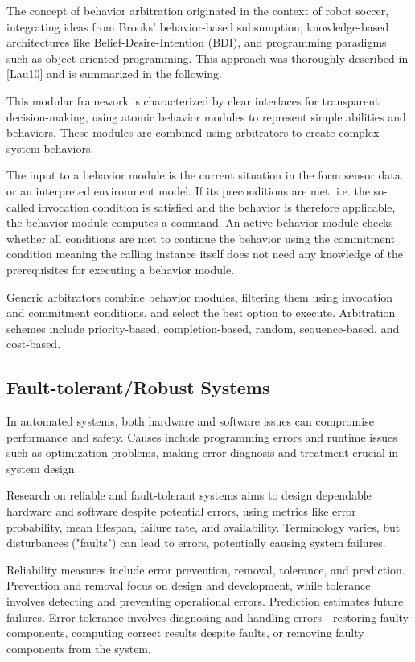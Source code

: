 The concept of behavior arbitration originated in the context of robot soccer, integrating ideas from Brooks' behavior-based subsumption, knowledge-based architectures like Belief-Desire-Intention (BDI), and programming paradigms such as object-oriented programming.
This approach was thoroughly described in [Lau10] and is summarized in the following.

This modular framework is characterized by clear interfaces for transparent decision-making, using atomic behavior modules to represent simple abilities and behaviors.
These modules are combined using arbitrators to create complex system behaviors.

The input to a behavior module is the current situation in the form sensor data or an interpreted environment model.
If its preconditions are met, i.e. the so-called invocation condition is satisfied and the behavior is therefore applicable, the behavior module computes a command.
An active behavior module checks whether all conditions are met to continue the behavior using the commitment condition meaning the calling instance itself does not need any knowledge of the prerequisites for executing a behavior module.

Generic arbitrators combine behavior modules, filtering them using invocation and commitment conditions, and select the best option to execute.
Arbitration schemes include priority-based, completion-based, random, sequence-based, and cost-based.

\subsection{Fault-tolerant/Robust Systems}

In automated systems, both hardware and software issues can compromise performance and safety.
Causes include programming errors and runtime issues such as optimization problems, making error diagnosis and treatment crucial in system design.

Research on reliable and fault-tolerant systems aims to design dependable hardware and software despite potential errors, using metrics like error probability, mean lifespan, failure rate, and availability.
Terminology varies, but disturbances ("faults") can lead to errors, potentially causing system failures.

Reliability measures include error prevention, removal, tolerance, and prediction.
Prevention and removal focus on design and development, while tolerance involves detecting and preventing operational errors.
Prediction estimates future failures.
Error tolerance involves diagnosing and handling errors—restoring faulty components, computing correct results despite faults, or removing faulty components from the system.

